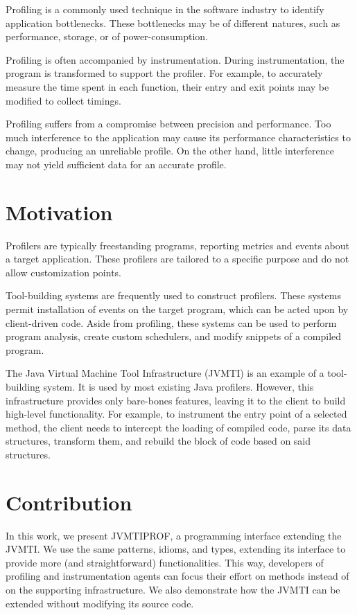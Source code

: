 \label{cap:introduction}

Profiling is a commonly used technique in the software industry to identify application bottlenecks. These bottlenecks may be of different natures, such as performance, storage, or of power-consumption.

Profiling is often accompanied by instrumentation. During instrumentation, the program is transformed to support the profiler. For example, to accurately measure the time spent in each function, their entry and exit points may be modified to collect timings.

Profiling suffers from a compromise between precision and performance. Too much interference to the application may cause its performance characteristics to change, producing an unreliable profile. On the other hand, little interference may not yield sufficient data for an accurate profile.

\section{Motivation}

Profilers are typically freestanding programs, reporting metrics and events about a target application. These profilers are tailored to a specific purpose and do not allow customization points.

Tool-building systems are frequently used to construct profilers. These systems permit installation of events on the target program, which can be acted upon by client-driven code. Aside from profiling, these systems can be used to perform program analysis, create custom schedulers, and modify snippets of a compiled program.

The Java Virtual Machine Tool Infrastructure (JVMTI) is an example of a tool-building system. It is used by most existing Java profilers. However, this infrastructure provides only bare-bones features, leaving it to the client to build high-level functionality. For example, to instrument the entry point of a selected method, the client needs to intercept the loading of compiled code, parse its data structures, transform them, and rebuild the block of code based on said structures.

\section{Contribution}

In this work, we present JVMTIPROF, a programming interface extending the JVMTI. We use the same patterns, idioms, and types, extending its interface to provide more (and straightforward) functionalities. This way, developers of profiling and instrumentation agents can focus their effort on methods instead of on the supporting infrastructure. We also demonstrate how the JVMTI can be extended without modifying its source code.

